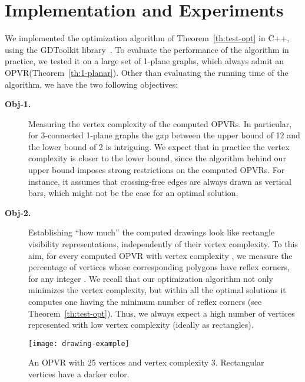 \documentclass{article}
\newcommand{\opvr}{OPVR\xspace}
\begin{document}
\section{Implementation and Experiments}\label{se:experiments}
We implemented the optimization algorithm of Theorem~\ref{th:test-opt} in C++, using the GDToolkit library~\cite{gdt-13}. To evaluate the performance of the algorithm in practice, we tested it on a large set of 1-plane graphs, which always admit an \opvr (Theorem~\ref{th:1-planar}). Other than evaluating the running time of the algorithm, we have the two following objectives:

\begin{description}
\item[\textbf{Obj-1.}]  Measuring the vertex complexity of the computed {\opvr}s. In particular, for 3-connected 1-plane graphs the gap between the upper bound of 12 and the lower bound of 2 is intriguing. We expect that in practice the vertex complexity is closer to the lower bound, since the algorithm behind our upper bound imposes strong restrictions on the computed {\opvr}s. For instance, it assumes that crossing-free edges are always drawn as vertical bars, which might not be the case for an optimal solution. 

\item[\textbf{Obj-2.}] Establishing ``how much'' the computed drawings look like rectangle visibility representations, independently of their vertex complexity. To this aim, for every computed \opvr with vertex complexity , we measure the percentage of vertices whose corresponding polygons have  reflex corners, for any integer . We recall that our optimization algorithm not only minimizes the vertex complexity, but within all the optimal solutions it computes one having the minimum number of reflex corners (see Theorem~\ref{th:test-opt}). Thus, we always expect a high number of vertices represented with low vertex complexity (ideally as rectangles).
\end{description} 

\begin{figure}[tb]
 \centering
 \texttt{[image: drawing-example]}
 \caption{An \opvr with 25 vertices and vertex complexity 3. Rectangular vertices have a darker color.}\label{fi:drawing-example}
\end{figure}
\end{document}
